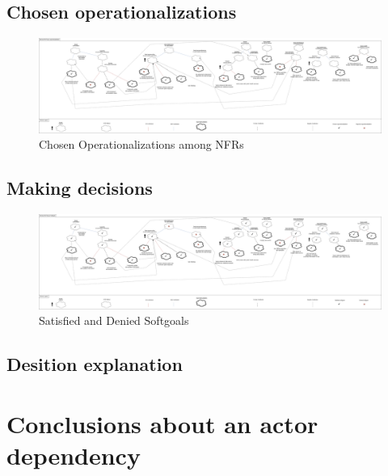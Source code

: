 \documentclass{VUMIFPSkursinis}
\begin{document}
\begin{landscape}
\subsection{Chosen operationalizations}
	\begin{figure}[H]
		\center
		\includegraphics[scale=0.2]{img/Operationalization}
		\caption{Chosen Operationalizations among NFRs} %
		\label{img:kurimoProcesas}
	\end{figure}
	
	
\subsection{Making decisions}
	\begin{figure}[H]
		\center
		\includegraphics[scale=0.2]{img/Satisfied-Goals}
		\caption{Satisfied and Denied Softgoals} %
		\label{img:kurimoProcesas}
	\end{figure}
\end{landscape}
\subsection{Desition explanation}
\section{Conclusions about an actor dependency}
	
\end{document}
